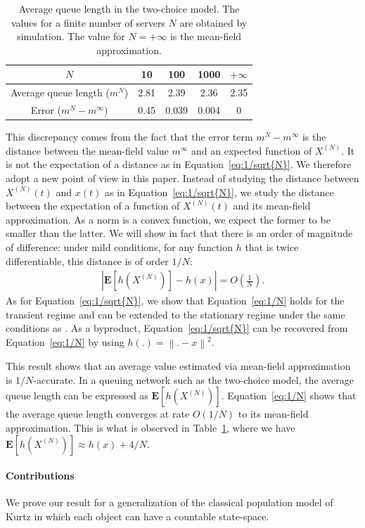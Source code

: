 \documentclass[sigconf]{acmart}
\newcommand\XN{X^{(N)}}
\newcommand\esp[1]{\mathbf{E}\left[#1\right]}
\newcommand\sesp[1]{\mathbf{E}[#1]}
\newcommand\norm[1]{\left\|#1\right\|}
\newcommand\abs[1]{\left|#1\right|}
\newcommand\p[1]{\left(#1\right)}
\begin{document}
\begin{table}[ht]
  \centering
  \begin{tabular}{|c|c|c|c|c|}
    \hline
    $N$ & 10 & 100 & 1000 &$+\infty$\\\hline
    Average queue length ($m^N$) &2.81&2.39&2.36& 2.35\\\hline
    Error ($m^N-m^\infty$) & 0.45 & 0.039 & 0.004 & 0 \\\hline
  \end{tabular}
  \caption{Average queue length in the two-choice model. The values for a
    finite number of servers
    $N$ are obtained by simulation. The value for $N=+\infty$ is the
    mean-field approximation. }
  \label{tab:power2}
\end{table}

This discrepancy comes from the fact that the error term
$m^N-m^\infty$ is the distance between the mean-field value $m^\infty$
and an expected function of $\XN$. It is not the expectation of a
distance as in Equation~\eqref{eq:1/sqrt{N}}. We therefore adopt a new
point of view in this paper. Instead of studying the distance between
$\XN(t)$ and $x(t)$ as in Equation~\eqref{eq:1/sqrt{N}}, we study the
distance between the expectation of a function of $\XN(t)$ and its
mean-field approximation.  As a norm is a convex function, we expect
the former to be smaller than the latter. We will show in fact that
there is an order of magnitude of difference: under mild conditions,
for any function $h$ that is twice differentiable, this distance is of
order $1/N$:
\begin{align}
  \label{eq:1/N}
  \abs{\esp{h(\XN)} - h(x)} = O\p{\frac1N}.
\end{align}
As for Equation~\eqref{eq:1/sqrt{N}}, we show that
Equation~\eqref{eq:1/N} holds for the transient regime and can be
extended to the stationary regime under the same conditions as
\cite{ying2016rate}.  As a byproduct, Equation~\eqref{eq:1/sqrt{N}}
can be recovered from Equation~\eqref{eq:1/N} by using
$h(.)=\norm{.-x}^2$.

This result shows that an average value estimated via mean-field
approximation is $1/N$-accurate.  In a queuing network such as the
two-choice model, the average queue length can be expressed as
$\sesp{h(\XN)}$.  Equation~\eqref{eq:1/N} shows that the average queue
length converges at rate $O(1/N)$ to its mean-field approximation.
This is what is observed in Table~\ref{tab:power2}, where we have
$\sesp{h(\XN)}\approx h(x)+4/N$.

\paragraph*{Contributions}
We prove our result for a generalization of the classical population
model of Kurtz in which each object can have a countable
state-space.
\end{document}
